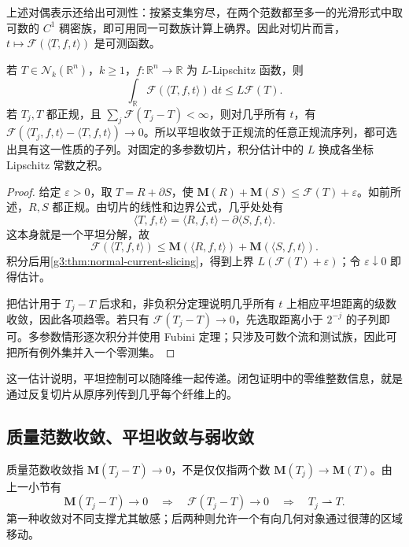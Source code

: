 上述对偶表示还给出可测性：按紧支集穷尽，在两个范数都至多一的光滑形式中取可数的 \(C^1\) 稠密族，即可用同一可数族计算上确界。因此对切片而言，\(t\mapsto\mathcal F(\langle T,f,t\rangle)\) 是可测函数。

\begin{proposition}\label{g3:prop:flat-slicing-estimate}
	若 \(T\in\mathcal N_k(\mathbb R^n)\)，\(k\ge1\)，\(f:\mathbb R^n\to\mathbb R\) 为 \(L\)-Lipschitz 函数，则
	\begin{equation}\label{g3:eq:flat-slicing-estimate}
		\int_{\mathbb R}\mathcal F(\langle T,f,t\rangle)\,\mathrm dt
		\le L\mathcal F(T).
	\end{equation}
	若 \(T_j,T\) 都正规，且 \(\sum_j\mathcal F(T_j-T)<\infty\)，则对几乎所有 \(t\)，有 \(\mathcal F(\langle T_j,f,t\rangle-\langle T,f,t\rangle)\to0\)。所以平坦收敛于正规流的任意正规流序列，都可选出具有这一性质的子列。对固定的多参数切片，积分估计中的 \(L\) 换成各坐标 Lipschitz 常数之积。
\end{proposition}
\begin{proof}
	给定 \(\varepsilon>0\)，取 \(T=R+\partial S\)，使 \(\mathbf M(R)+\mathbf M(S)\le\mathcal F(T)+\varepsilon\)。如前所述，\(R,S\) 都正规。由切片的线性和边界公式，几乎处处有
	\[
		\langle T,f,t\rangle
		=\langle R,f,t\rangle-\partial\langle S,f,t\rangle.
	\]
	这本身就是一个平坦分解，故
	\[
		\mathcal F(\langle T,f,t\rangle)
		\le\mathbf M(\langle R,f,t\rangle)+\mathbf M(\langle S,f,t\rangle).
	\]
	积分后用\cref{g3:thm:normal-current-slicing}，得到上界 \(L(\mathcal F(T)+\varepsilon)\)；令 \(\varepsilon\downarrow0\) 即得估计。

	把估计用于 \(T_j-T\) 后求和，非负积分定理说明几乎所有 \(t\) 上相应平坦距离的级数收敛，因此各项趋零。若只有 \(\mathcal F(T_j-T)\to0\)，先选取距离小于 \(2^{-j}\) 的子列即可。多参数情形逐次积分并使用 Fubini 定理；只涉及可数个流和测试族，因此可把所有例外集并入一个零测集。
\end{proof}

这一估计说明，平坦控制可以随降维一起传递。闭包证明中的零维整数信息，就是通过反复切片从原序列传到几乎每个纤维上的。

\subsection{质量范数收敛、平坦收敛与弱收敛}
\label{g3:subsec:2203:04}
质量范数收敛指 \(\mathbf M(T_j-T)\to0\)，不是仅仅指两个数 \(\mathbf M(T_j)\to\mathbf M(T)\)。由上一小节有
\[
	\mathbf M(T_j-T)\longrightarrow0
	\quad\Longrightarrow\quad
	\mathcal F(T_j-T)\longrightarrow0
	\quad\Longrightarrow\quad T_j\rightharpoonup T.
\]
第一种收敛对不同支撑尤其敏感；后两种则允许一个有向几何对象通过很薄的区域移动。

